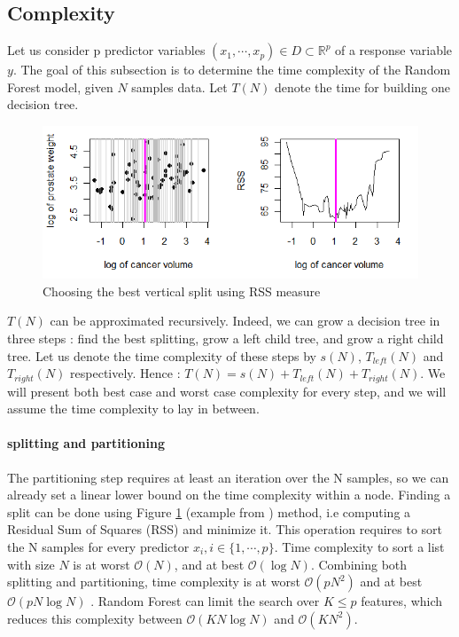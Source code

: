 \documentclass[english,11pt,openany]{article}
\theoremstyle{definition}
\newcommand{\R}{\mathbb{R}}
\newcommand{\bigO}{\mathcal{O}}
\theoremstyle{plain}
\theoremstyle{definition}
\begin{document}
\begin{appendices}
	
\subsection{Complexity}

Let us consider p predictor variables $(x_1, \cdots, x_p) \in D \subset \R^p$  of a response variable $y$. The goal of this subsection is to determine the time complexity of the Random Forest model, given $N$ samples data. 
\newline
Let $T(N)$ denote the time for building one decision tree. 

\begin{figure}[h!]
	\includegraphics[scale=0.8]{sorting_split.png}
	\caption{Choosing the best vertical split using RSS measure} \label{figure:sorting}
\end{figure}


$T(N)$ can be approximated recursively. 
Indeed, we can grow a decision tree in three steps : find the best splitting, grow a left child tree, and grow a right child tree.
\newline 
Let us denote the time complexity of these steps by $s(N)$, $T_{left}(N)$ and $T_{right}(N)$ respectively. 
Hence : $T(N) = s(N) + T_{left}(N) + T_{right}(N)$.
We will present both best case and worst case complexity for every step, and we will assume the time complexity to lay in between. 
\paragraph{splitting and partitioning}
	The partitioning step requires at least an iteration over the N samples, so we can already set a linear lower bound on the time complexity within a node.
	Finding a split can be done using Figure \ref{figure:sorting} (example from \cite{Cutler:slides}) method, i.e computing a Residual Sum of Squares (RSS) and minimize it. 
	This operation requires to sort the N samples for every predictor $x_i, i\in \{1, \cdots, p\}$. 
	Time complexity to sort a list with size $N$ is at worst $\mathcal{O} (N)$, and at best $\bigO(\log N)$. 
	Combining both splitting and partitioning, time complexity is at worst $\mathcal{O} (p N^2)$ and at best $\bigO(p N \log N)$ . 
	Random Forest can limit the search over $K \leq p$ features, which reduces this complexity between $\mathcal{O} (K N\log N)$ and $\mathcal{O} (K N^2)$. 
	

\end{appendices}
\end{document}
